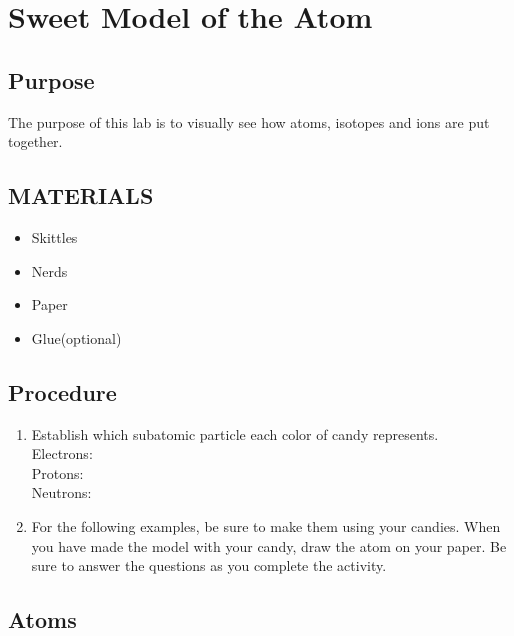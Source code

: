 \documentclass[a4paper,12pt]{exam}
\begin{document}
\section*{Sweet Model of the Atom}

\subsection*{Purpose}
The purpose of this lab is to visually see how atoms, isotopes and ions are put together.


 \subsection*{MATERIALS}

 \begin{itemize}
    \item Skittles
    \item Nerds
    \item Paper
    \item Glue(optional)
\end{itemize}

 \subsection*{Procedure}

 \begin{enumerate}

    \item Establish which subatomic particle each color of candy represents.\\
        Electrons:\\
        Protons:\\
        Neutrons:
    \item For the following examples, be sure to make them using your candies. When you have made the model with your candy, draw the atom on your paper.
    Be sure to answer the questions as you complete the activity.

\end{enumerate}




\subsection*{Atoms}

\begin{questions}
    
\question {}
\vspace{8cm}

\pagebreak
\question {}
\vspace{8cm}


\question {}
\vspace{8cm}

\question {}
\vspace{8cm}


\end{questions}
\end{document}
